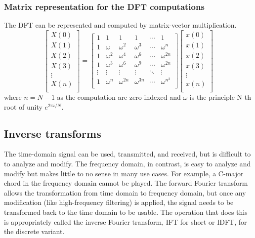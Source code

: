 \subsubsection{Matrix representation for the DFT computations} 
The DFT can be represented and computed by matrix-vector multiplication. 
$$
\begin{bmatrix}
    X(0) \\
    X(1) \\
    X(2) \\
    X(3) \\
    \vdots\\
    X(n) \\
\end{bmatrix}
=
\begin{bmatrix}
    1 & 1 & 1 & 1 & \cdots & 1\\
    1 & \omega & \omega ^2 & \omega ^3 & \cdots & \omega ^n\\
    1 & \omega ^2 & \omega ^4 & \omega ^6 & \cdots & \omega ^{2n}\\
    1 & \omega ^3 & \omega ^6 & \omega ^9 & \cdots & \omega ^{2n}\\
    \vdots & \vdots & \vdots & \vdots & \ddots & \vdots \\
    1 & \omega ^{n} & \omega ^{2n} & \omega ^{3n} & \cdots & \omega ^{{n^2}}\\
\end{bmatrix}
\begin{bmatrix}
    x(0) \\
    x(1) \\
    x(2) \\
    x(3) \\
    \vdots\\
    x(n) \\
\end{bmatrix}
$$
where $n = N-1$ as the computation are zero-indexed and $\omega$ is the principle N-th root of unity $e^{2\pi i/N} $. 


\subsection{Inverse transforms}
The time-domain signal can be used, transmitted, and received, but is difficult to to analyze and modify. The frequency domain, in contrast, is easy to analyze and modify but makes little to no sense in many use cases. For example, a C-major chord in the frequency domain cannot be played. The forward Fourier transform allows the transformation from time domain to frequency domain, but once any modification (like high-frequency filtering) is applied, the signal needs to be transformed back to the time domain to be usable. The operation that does this is appropriately called the inverse Fourier transform, IFT for short or IDFT, for the discrete variant.

